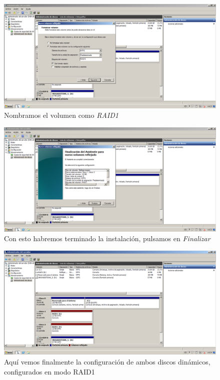 \begin{figure}[H]
	\centering
	\includegraphics[scale=0.4]{WS2008-4}
	\caption{Nombramos el volumen como \emph{RAID1}}
	\label{fig:figura6}
\end{figure}

\begin{figure}[H]
	\centering
	\includegraphics[scale=0.4]{WS2008-5}
	\caption{Con esto habremos terminado la instalación, pulsamos en \emph{Finalizar}}
	\label{fig:figura7}
\end{figure}

\begin{figure}[H]
	\centering
	\includegraphics[scale=0.4]{WS2008-6}
	\caption{Aquí vemos finalmente la configuración de ambos discos dinámicos, configurados en modo RAID1}
	\label{fig:figura7}
\end{figure}


